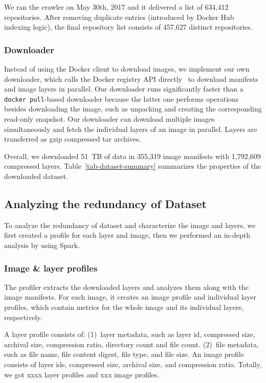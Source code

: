 We ran the crawler on May 30th, 2017 and it delivered a list of 634,412 repositories.
After removing duplicate entries (introduced by Docker Hub indexing logic),
the final repository list consists of 457,627
distinct repositories. 

\subsubsection{Downloader}

Instead of using the Docker client to download images,
we implement our own downloader, which calls the Docker registry API
directly~\cite{dockerregistryclient} to download manifests
and image layers in parallel.
Our downloader runs significantly faster than a \texttt{docker pull}-based downloader
because the latter one performs operations besides downloading the image, such as unpacking and creating the corresponding read-only snapshot.
Our downloader can download multiple images simultaneously and fetch
the individual layers of an image in parallel. Layers are transferred as gzip
compressed tar archives.

Overall, we downloaded 51~TB of data in 355,319 image manifests with 1,792,609
compressed layers.
Table~\ref{tab-dataset-summary} summarizes the properties of the downloaded
dataset.


\subsection{Analyzing the redundancy of Dataset}

To analyze the redundancy of dataset and characterize the image and layers, we first created a profile for each layer and image, then we performed an in-depth analysis by using Spark.

\subsubsection{Image \& layer profiles}

The profiler extracts the downloaded layers
and analyzes them along with the image manifests.
For each image, it creates an image profile and individual layer profiles,
which contain metrics for the whole image and
its individual layers, respectively.

A layer profile consists of: (1)~layer metadata, such as layer id, compressed size, archival size, compression ratio, directory count and file count. (2)~file metadata, such as file name, file content digest, file type, and file size. 
An image profile consists of layer ids, compressed size, archival size, and compression ratio. Totally, we got xxxx layer profiles and xxx image profiles.

